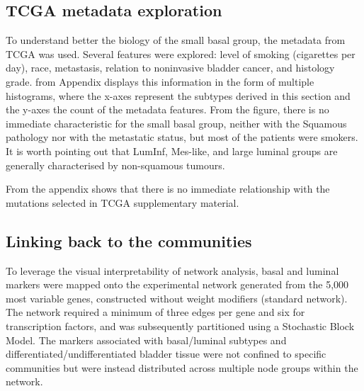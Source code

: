 \newpage

\subsection{TCGA metadata exploration} \label{s:N_I:sel_tfs_metadata}

To understand better the biology of the small basal group, the metadata from TCGA \citep{Cancer_Genome_Atlas_Research_Network2014-xp} was used. Several features were explored: level of smoking (cigarettes per day), race, metastasis, relation to noninvasive bladder cancer, and histology grade.  from Appendix displays this information in the form of multiple histograms, where the x-axes represent the subtypes derived in this section and the y-axes the count of the metadata features. From the figure, there is no immediate characteristic for the small basal group, neither with the Squamous pathology nor with the metastatic status, but most of the patients were smokers. It is worth pointing out that LumInf, Mes-like, and large luminal groups are generally characterised by non-squamous tumours. 

From the appendix  shows that there is no immediate relationship with the mutations selected in TCGA supplementary material.


\subsection{Linking back to the communities} \label{s:N_I:sel_tfs_net}

To leverage the visual interpretability of network analysis, basal and luminal markers were mapped onto the experimental network generated from the 5,000 most variable genes, constructed without weight modifiers (standard network). The network required a minimum of three edges per gene and six for transcription factors, and was subsequently partitioned using a Stochastic Block Model. The markers associated with basal/luminal subtypes and differentiated/undifferentiated bladder tissue were not confined to specific communities but were instead distributed across multiple node groups within the network.


